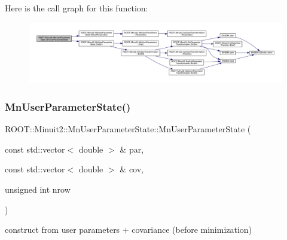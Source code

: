 Here is the call graph for this function\+:
\nopagebreak
\begin{figure}[H]
\begin{center}
\leavevmode
\includegraphics[width=350pt]{d3/de0/classROOT_1_1Minuit2_1_1MnUserParameterState_aa4a32c2e51a89c2feca7a376972f1ff5_cgraph}
\end{center}
\end{figure}
\mbox{\label{classROOT_1_1Minuit2_1_1MnUserParameterState_a146a0e2f845431830d795b919bb8f594}} 
\subsubsection{\texorpdfstring{MnUserParameterState()}{MnUserParameterState()}\hspace{0.1cm}{\footnotesize\ttfamily [4/24]}}
{\footnotesize\ttfamily R\+O\+O\+T\+::\+Minuit2\+::\+Mn\+User\+Parameter\+State\+::\+Mn\+User\+Parameter\+State (\begin{DoxyParamCaption}\item[{const std\+::vector$<$ double $>$ \&}]{par,  }\item[{const std\+::vector$<$ double $>$ \&}]{cov,  }\item[{unsigned int}]{nrow }\end{DoxyParamCaption})}



construct from user parameters + covariance (before minimization) 

